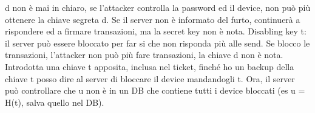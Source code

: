 \documentclass[16px]{article}
\begin{document}
d non è mai in chiaro, se l'attacker controlla la password ed il device, non può più ottenere la chiave segreta d. Se il server non è informato del furto, continuerà a rispondere ed a firmare transazioni, ma la secret key non è nota. Disabling key t: il server può essere bloccato per far si che non risponda più alle send. Se blocco le transazioni, l'attacker non può più fare transazioni, la chiave d non è nota. Introdotta una chiave t apposita, inclusa nel ticket, finché ho un backup della chiave t posso dire al server di bloccare il device mandandogli t. Ora, il server può controllare che u non è in un DB che contiene tutti i device bloccati (es u = H(t), salva quello nel DB).
\end{document}
